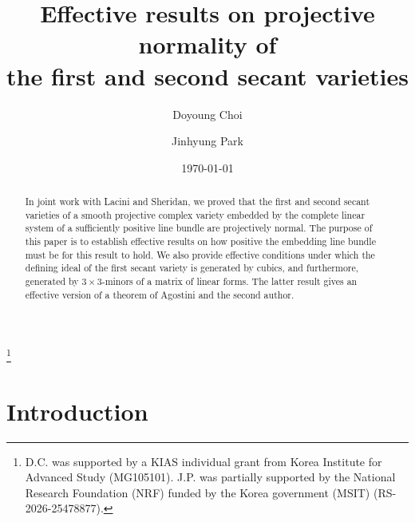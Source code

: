 \documentclass{amsart}
\theoremstyle{plain}
\theoremstyle{definition}
\theoremstyle{remark}
\begin{document}
\title[{Effective results on projective normality of the first and second secant varieties}]{Effective results on projective normality of\\ the first and second secant varieties}

\author{Doyoung Choi}
\address{School of Mathematics, Korea Institute for Advanced Study, 85 Hoegiro, Dongdaemun-gu, Seoul 02455, Republic of Korea}

\author{Jinhyung Park}
\address{Department of Mathematical Sciences, KAIST, 291 Daehak-ro, Yuseong-gu, Daejeon 34141, Republic of Korea}

\date{\today}

\thanks{D.C. was supported by a KIAS individual grant from Korea Institute for Advanced Study (MG105101). J.P. was partially supported by the National Research Foundation (NRF) funded by the Korea government (MSIT) (RS-2026-25478877).}


\begin{abstract}
In joint work with Lacini and Sheridan, we proved that the first and second secant varieties of a smooth projective complex variety embedded by the complete linear system of a sufficiently positive line bundle are projectively normal. The purpose of this paper is to establish effective results on how positive the embedding line bundle must be for this result to hold. We also provide effective conditions under which the defining ideal of the first secant variety is generated by cubics, and furthermore, generated by $3 \times 3$-minors of a matrix of linear forms. The latter result gives an effective version of a theorem of Agostini and the second author. 
\end{abstract}

\maketitle

\section{Introduction}
\end{document}
